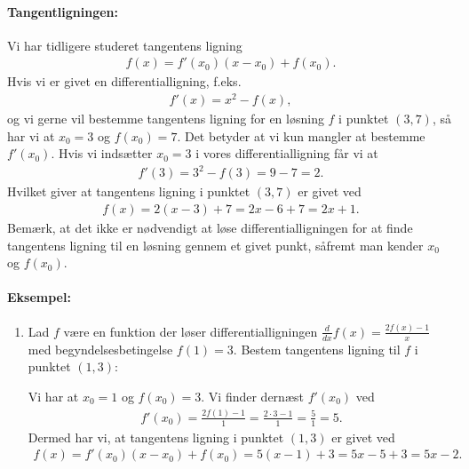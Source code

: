 \paragraph*{Tangentligningen:}
Vi har tidligere studeret tangentens ligning
\begin{align*}
f(x)=f'(x_0)(x-x_0)+f(x_0).
\end{align*}
Hvis vi er givet en differentialligning, f.eks.
\begin{align*}
f'(x)=x^2-f(x),
\end{align*}
og vi gerne vil bestemme tangentens ligning for en løsning $f$ i punktet $(3,7)$, så har vi at $x_0=3$ og $f(x_0)=7$. Det betyder at vi kun mangler at bestemme $f'(x_0)$. Hvis vi indsætter $x_0=3$ i vores differentialligning får vi at
\begin{align*}
f'(3)=3^2-f(3)=9-7=2.
\end{align*}
Hvilket giver at tangentens ligning i punktet $(3,7)$ er givet ved
\begin{align*}
f(x)=2(x-3)+7 = 2x -6 + 7 = 2x+1.
\end{align*}
Bemærk, at det ikke er nødvendigt at løse differentialligningen for at finde tangentens ligning til en løsning gennem et givet punkt, såfremt man kender $x_0$ og $f(x_0)$.

\paragraph*{Eksempel:}
\begin{enumerate}
\item Lad $f$ være en funktion der løser differentialligningen $\displaystyle \frac{d}{dx}f(x) = \frac{2f(x)-1}{x}$ med begyndelsesbetingelse $f(1)=3$. Bestem tangentens ligning til $f$ i punktet $(1,3)$:

Vi har at $x_0=1$ og $f(x_0)=3$. Vi finder dernæst $f'(x_0)$ ved
\begin{align*}
f'(x_0) = \frac{2f(1)-1}{1} = \frac{2 \cdot 3 - 1}{1} = \frac{5}{1} = 5.
\end{align*}
Dermed har vi, at tangentens ligning i punktet $(1,3)$ er givet ved
\begin{align*}
f(x)=f'(x_0)(x-x_0)+f(x_0)=5(x-1)+3 = 5x-5+3 = 5x-2.
\end{align*}
\end{enumerate}










